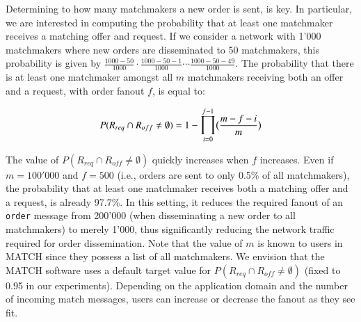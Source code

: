 Determining to how many matchmakers a new order is sent, is key.
In particular, we are interested in computing the probability that at least one matchmaker receives a matching offer and request.
If we consider a network with 1'000 matchmakers where new orders are disseminated to 50 matchmakers, this probability is given by $ \frac{1000-50}{1000} \cdot \frac{1000-50-1}{1000} \cdots \frac{1000-50-49}{1000} $.
The probability that there is at least one matchmaker amongst all $ m $ matchmakers receiving both an offer and a request, with order fanout $ f $, is equal to:

\begin{equation}
P(R_{req} \cap R_{off} \neq \emptyset) = 1 - \mathlarger{\prod}_{i=0}^{f-1} \big(\frac{m - f - i}{m}\big)
\label{eq:dissemination}
\end{equation}

The value of $ P(R_{req} \cap R_{off} \neq \emptyset) $ quickly increases when $ f $ increases.
Even if $ m = 100'000 $ and $ f = 500 $ (i.e., orders are sent to only 0.5\% of all matchmakers), the probability that at least one matchmaker receives both a matching offer and a request, is already 97.7\%.
In this setting, it reduces the required fanout of an \texttt{order} message from 200'000 (when disseminating a new order to all matchmakers) to merely 1'000, thus significantly reducing the network traffic required for order dissemination.
Note that the value of $ m $ is known to users in MATCH since they possess a list of all matchmakers.
We envision that the MATCH software uses a default target value for $ P(R_{req} \cap R_{off} \neq \emptyset) $ (fixed to 0.95 in our experiments).
Depending on the application domain and the number of incoming match messages, users can increase or decrease the fanout as they see fit.

